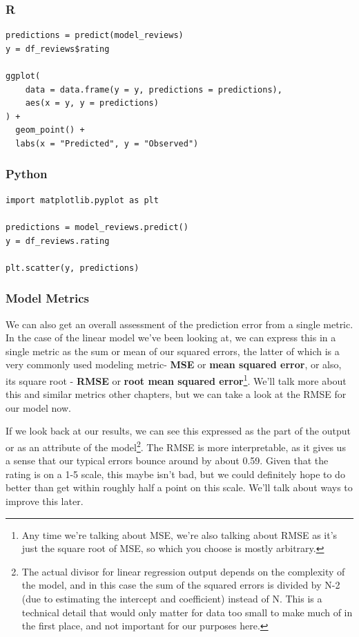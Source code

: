 \documentclass[
  letterpaper,
]{krantz}
\begin{document}
\subsubsection{R}

\begin{verbatim}
predictions = predict(model_reviews)
y = df_reviews$rating

ggplot(
    data = data.frame(y = y, predictions = predictions), 
    aes(x = y, y = predictions)
) +
  geom_point() +
  labs(x = "Predicted", y = "Observed")
\end{verbatim}

\subsubsection{Python}

\begin{verbatim}
import matplotlib.pyplot as plt

predictions = model_reviews.predict()
y = df_reviews.rating

plt.scatter(y, predictions)
\end{verbatim}

\subsubsection{Model Metrics}\label{sec-lm-interpretation-model-metrics}

We can also get an overall assessment of the prediction error from a
single metric. In the case of the linear model we've been looking at, we
can express this in a single metric as the sum or mean of our squared
errors, the latter of which is a very commonly used modeling metric-
\textbf{MSE} or \textbf{mean squared error}, or also, its square root -
\textbf{RMSE} or \textbf{root mean squared error}\footnote{Any time
  we're talking about MSE, we're also talking about RMSE as it's just
  the square root of MSE, so which you choose is mostly arbitrary.}.
We'll talk more about this and similar metrics other chapters, but we
can take a look at the RMSE for our model now.

If we look back at our results, we can see this expressed as the part of
the output or as an attribute of the model\footnote{The actual divisor
  for linear regression output depends on the complexity of the model,
  and in this case the sum of the squared errors is divided by N-2 (due
  to estimating the intercept and coefficient) instead of N. This is a
  technical detail that would only matter for data too small to make
  much of in the first place, and not important for our purposes here.}.
The RMSE is more interpretable, as it gives us a sense that our typical
errors bounce around by about 0.59. Given that the rating is on a 1-5
scale, this maybe isn't bad, but we could definitely hope to do better
than get within roughly half a point on this scale. We'll talk about
ways to improve this later.
\end{document}
